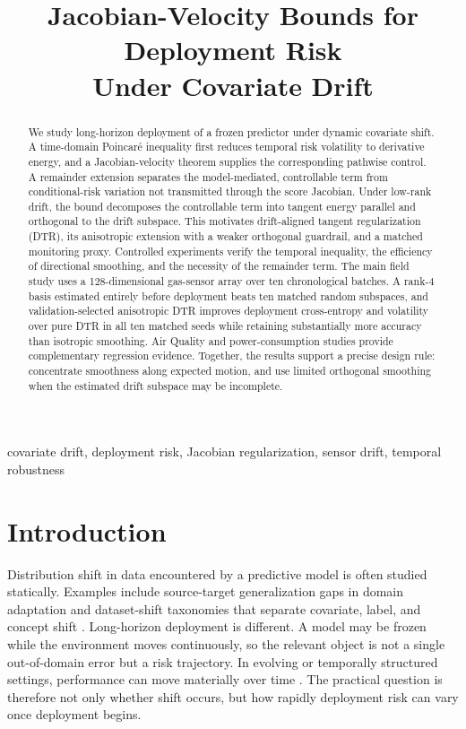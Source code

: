 \documentclass[conference]{IEEEtran}
\title{Jacobian-Velocity Bounds for Deployment Risk\\Under Covariate Drift}
\author{
\IEEEauthorblockN{Jonathan R. Landers}
\IEEEauthorblockA{
\orcidlink{0000-0003-1872-6179}\,\href{https://orcid.org/0000-0003-1872-6179}{0000-0003-1872-6179}\\
New York, NY, USA\\
\href{mailto:jonathan.robert.landers@gmail.com}{jonathan.robert.landers@gmail.com}\\[-1pt]
{\footnotesize
\href{https://github.com/jonland82/jacobian-velocity-bounds}{\faGithub\ Repository}
\quad
\href{https://jonland82.github.io/jacobian-velocity-bounds/}{\faGlobe\ Project site}}
}
}
\begin{document}
\maketitle

\begin{abstract}
We study long-horizon deployment of a frozen predictor under dynamic covariate shift. A time-domain Poincar\'e inequality first reduces temporal risk volatility to derivative energy, and a Jacobian-velocity theorem supplies the corresponding pathwise control. A remainder extension separates the model-mediated, controllable term from conditional-risk variation not transmitted through the score Jacobian. Under low-rank drift, the bound decomposes the controllable term into tangent energy parallel and orthogonal to the drift subspace. This motivates drift-aligned tangent regularization (DTR), its anisotropic extension with a weaker orthogonal guardrail, and a matched monitoring proxy. Controlled experiments verify the temporal inequality, the efficiency of directional smoothing, and the necessity of the remainder term. The main field study uses a 128-dimensional gas-sensor array over ten chronological batches. A rank-$4$ basis estimated entirely before deployment beats ten matched random subspaces, and validation-selected anisotropic DTR improves deployment cross-entropy and volatility over pure DTR in all ten matched seeds while retaining substantially more accuracy than isotropic smoothing. Air Quality and power-consumption studies provide complementary regression evidence. Together, the results support a precise design rule: concentrate smoothness along expected motion, and use limited orthogonal smoothing when the estimated drift subspace may be incomplete.
\end{abstract}

\begin{IEEEkeywords}
covariate drift, deployment risk, Jacobian regularization, sensor drift, temporal robustness
\end{IEEEkeywords}

\section{Introduction}
Distribution shift in data encountered by a predictive model is often studied statically. Examples include source-target generalization gaps in domain adaptation \cite{ben-david-shift} and dataset-shift taxonomies that separate covariate, label, and concept shift \cite{moreno-shift}. Long-horizon deployment is different. A model may be frozen while the environment moves continuously, so the relevant object is not a single out-of-domain error but a risk trajectory. In evolving or temporally structured settings, performance can move materially over time \cite{gama-drift,koh-wilds,yao-wildtime,han-temporal}. The practical question is therefore not only whether shift occurs, but how rapidly deployment risk can vary once deployment begins.
\end{document}
